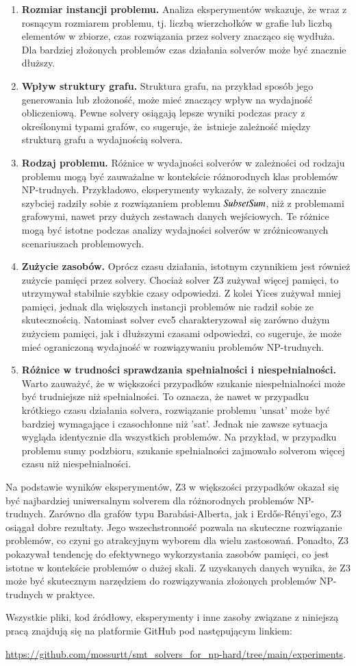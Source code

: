 \begin{enumerate}
	\item \textbf{Rozmiar instancji problemu.} 
	Analiza eksperymentów wskazuje, że wraz z rosnącym rozmiarem problemu, tj. liczbą wierzchołków w grafie lub liczbą elementów w zbiorze, czas rozwiązania przez solvery znacząco się wydłuża. Dla bardziej złożonych problemów czas działania solverów może być znacznie dłuższy.
	\item \textbf{Wpływ struktury grafu.}
	Struktura grafu, na przykład sposób jego generowania lub złożoność, może mieć znaczący wpływ na wydajność obliczeniową. Pewne solvery osiągają lepsze wyniki podczas pracy z określonymi typami grafów, co sugeruje, że~istnieje zależność między strukturą grafu a wydajnością solvera.
	\item \textbf{Rodzaj problemu.} 
	Różnice w wydajności solverów w zależności od rodzaju problemu mogą być zauważalne w kontekście różnorodnych klas problemów NP-trudnych. Przykładowo, eksperymenty wykazały, że solvery znacznie szybciej radziły sobie z rozwiązaniem problemu ${\mathit{SubsetSum}}$, niż z problemami grafowymi, nawet przy dużych zestawach danych wejściowych. Te różnice mogą być istotne podczas analizy wydajności solverów w zróżnicowanych scenariuszach problemowych.
	\item \textbf{Zużycie zasobów.} 
	Oprócz czasu działania, istotnym czynnikiem jest również zużycie pamięci przez solvery. Chociaż solver Z3 zużywał więcej pamięci, to utrzymywał stabilnie szybkie czasy odpowiedzi. Z kolei Yices zużywał mniej pamięci, jednak dla większych instancji problemów nie radził sobie ze skutecznością. Natomiast solver cvc5 charakteryzował się zarówno dużym zużyciem pamięci, jak i dłuższymi czasami odpowiedzi, co sugeruje, że może mieć ograniczoną wydajność w rozwiązywaniu problemów NP-trudnych.
	\item \textbf{Różnice w trudności sprawdzania spełnialności i niespełnialności.} 
	Warto zauważyć, że w większości przypadków szukanie niespełnialności może być trudniejsze niż spełnialności. To oznacza, że nawet w przypadku krótkiego czasu działania solvera, rozwiązanie problemu 'unsat' może być bardziej wymagające i czasochłonne niż 'sat'. Jednak nie zawsze sytuacja wygląda identycznie dla wszystkich problemów. Na przykład, w przypadku problemu sumy podzbioru, szukanie spełnialności zajmowało solverom więcej czasu niż niespełnialności. 
\end{enumerate}	

Na podstawie wyników eksperymentów, Z3 w większości przypadków okazał się być najbardziej uniwersalnym solverem dla różnorodnych problemów NP-trudnych. Zarówno dla grafów typu Barabási-Alberta, jak i Erdős-Rényi'ego, Z3 osiągał dobre rezultaty. Jego wszechstronność pozwala na skuteczne rozwiązanie problemów, co czyni go atrakcyjnym wyborem dla wielu zastosowań. Ponadto, Z3 pokazywał tendencję do efektywnego wykorzystania zasobów pamięci, co jest istotne w kontekście problemów o dużej skali. Z uzyskanych danych wynika, że Z3 może być skutecznym narzędziem do rozwiązywania złożonych problemów NP-trudnych w praktyce.

Wszystkie pliki, kod źródłowy, eksperymenty i inne zasoby związane z niniejszą pracą znajdują się na platformie GitHub pod następującym linkiem:

\url{https://github.com/mossurtt/smt_solvers_for_np-hard/tree/main/experiments}.
